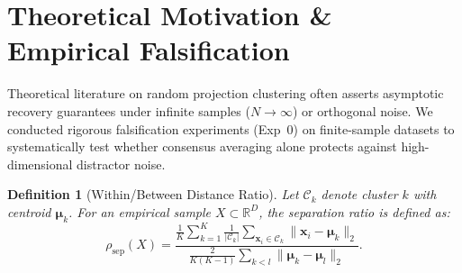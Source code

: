 \documentclass[10pt,conference]{IEEEtran}
\newtheorem{definition}{Definition}
\begin{document}
\begin{table}[!t]
\caption{Methodological Taxonomy Across Consensus Paradigms}
\label{tab:taxonomy_comparison}
\centering
\scriptsize
\setlength{\tabcolsep}{3.0pt}
\end{table}


\section{Theoretical Motivation \& Empirical Falsification}\label{sec:falsification}

Theoretical literature on random projection clustering often asserts asymptotic recovery guarantees under infinite samples ($N \to \infty$) or orthogonal noise. We conducted rigorous falsification experiments (Exp~0) on finite-sample datasets to systematically test whether consensus averaging alone protects against high-dimensional distractor noise.

\begin{definition}[Within/Between Distance Ratio]
Let $\mathcal{C}_k$ denote cluster $k$ with centroid $\boldsymbol{\mu}_k$. For an empirical sample $X \subset \mathbb{R}^D$, the separation ratio is defined as:
\begin{equation}
    \rho_{\text{sep}}(X) = \frac{\frac{1}{K}\sum_{k=1}^K \frac{1}{|\mathcal{C}_k|}\sum_{\mathbf{x}_i \in \mathcal{C}_k} \|\mathbf{x}_i - \boldsymbol{\mu}_k\|_2}{\frac{2}{K(K-1)}\sum_{k < l} \|\boldsymbol{\mu}_k - \boldsymbol{\mu}_l\|_2}.
\end{equation}
\end{definition}
\end{document}
